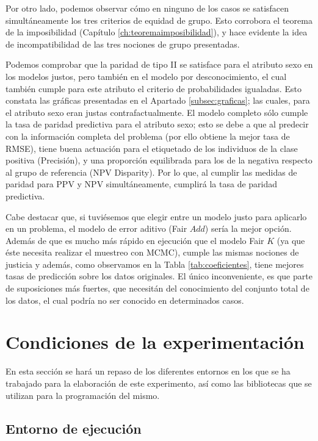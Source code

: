 \documentclass[oneside,openright,titlepage,numbers=noenddot,openany,headinclude,footinclude=true,
cleardoublepage=empty,abstractoff,BCOR=5mm,paper=a4,fontsize=12pt,main=spanish]{scrreprt}
\begin{document}
Por otro lado, podemos observar cómo en ninguno de los casos se satisfacen simultáneamente los tres criterios de equidad de grupo. Esto corrobora el teorema de la imposibilidad (Capítulo \ref{ch:teoremaimposibilidad}), y hace evidente la idea de incompatibilidad de las tres nociones de grupo presentadas.

Podemos comprobar que la paridad de tipo II se satisface para el atributo sexo en los modelos justos, pero también en el modelo por desconocimiento, el cual también cumple para este atributo el criterio de probabilidades igualadas. Esto constata las gráficas presentadas en el Apartado \ref{subsec:graficas}; las cuales, para el atributo sexo eran justas contrafactualmente. El modelo completo sólo cumple la tasa de paridad predictiva para el atributo sexo; esto se debe a que al predecir con la información completa del problema (por ello obtiene la mejor tasa de RMSE), tiene buena actuación para el etiquetado de los individuos de la clase positiva (Precisión), y una proporción equilibrada para los de la negativa respecto al grupo de referencia (NPV Disparity). Por lo que, al cumplir las medidas de paridad para PPV y NPV simultáneamente, cumplirá la tasa de paridad predictiva.

Cabe destacar que, si tuviésemos que elegir entre un modelo justo para aplicarlo en un problema, el modelo de error aditivo (Fair $Add$) sería la mejor opción. Además de que es mucho más rápido en ejecución que el modelo Fair $K$ (ya que éste necesita realizar el muestreo con MCMC), cumple las mismas nociones de justicia y además, como observamos en la Tabla \ref{tab:coeficientes}, tiene mejores tasas de predicción sobre los datos originales. El único inconveniente, es que parte de suposiciones más fuertes, que necesitán del conocimiento del conjunto total de los datos, el cual podría no ser conocido en determinados casos.

\section{Condiciones de la experimentación}

En esta sección se hará un repaso de los diferentes entornos en los que se ha trabajado para la elaboración de este experimento, así como las bibliotecas que se utilizan para la programación del mismo.

\subsection{Entorno de ejecución}
\end{document}
